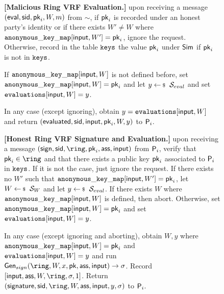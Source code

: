 \begin{figure}
\begin{tcolorbox}[left=2pt,right=2pt]
{			\textbf{[Malicious Ring VRF Evaluation.]} upon receiving a message $(\mathsf{eval}, \textsf{sid}, \mathsf{pk}_i, W, m)$ from $\sim$, if $ \mathsf{pk}_i $ is recorded under an honest party's identity or if there exists $ W'\neq W $ where $ \mathtt{anonymous\_key\_map}[\mathsf{input},W'] = \mathsf{pk}_i $, ignore the request.
			Otherwise, record in the table $\texttt{keys}$ the value $\mathsf{pk}_i$ under $\mathsf{Sim}$ if $ \mathsf{pk}_i $ is not in $ \texttt{keys} $.
			
			 If  $\mathtt{anonymous\_key\_map}[\mathsf{input},W]  $ is not defined before, set $ \mathtt{anonymous\_key\_map}[\mathsf{input},W] = \mathsf{pk}_i $ and let   $y \leftsample \setsym{S}_{eval}$ and set $ \texttt{evaluations}[\mathsf{input}, W] = y$.
			
			In any case (except ignoring), obtain $ y = \texttt{evaluations}[\mathsf{input}, W] $ and return $(\mathsf{evaluated}, \textsf{sid},  \mathsf{input}, \mathsf{pk}_i,W, y)$ to $ \mathsf{P}_i $.

				
			\textbf{[Honest Ring VRF Signature and Evaluation.]} upon receiving a message $(\oramsg{sign}, \sid, \ring, \pk_i,\aux, \msg)$ from $\mathsf{P}_i$, verify that $\pk_i \in \ring$ and that there exists a public key $\mathsf{pk}_i$ associated to $\mathsf{P}_i$ in $ \texttt{keys} $. If it is not the case, just ignore the request. 	
			If there exists no $ W' $ such that $ \mathtt{anonymous\_key\_map}[\mathsf{input},W'] =  \mathsf{pk}_i $, let $ W \leftsample \setsym{S}_W $ and let $y \leftsample \setsym{S}_{eval}$. If there exists $ W $ where $ \mathtt{anonymous\_key\_map}[\mathsf{input},W] $ is defined, then abort. Otherwise, set $ \mathtt{anonymous\_key\_map}[\mathsf{input},W] = \mathsf{pk}_i $ and set $ \texttt{evaluations}[\mathsf{input}, W] = y$.
			
			In any case (except ignoring and aborting), obtain $ W, y $ where $ \mathtt{anonymous\_key\_map}[\mathsf{input},W] =\mathsf{pk}_i $ and $ \texttt{evaluations}[\mathsf{input}, W] = y$  and run  $ \Gen_{sign}(\ring, W,x,\pk,\aux,\msg) \rightarrow \sigma $. 
			Record $ [\msg,\aux, W, \ring,\sigma, 1] $. Return $(\oramsg{signature}, \sid, \ring,W,\aux,\msg, y, \sigma)$ to $\mathsf{P}_i$.
			
}
\end{tcolorbox}
\end{figure}
